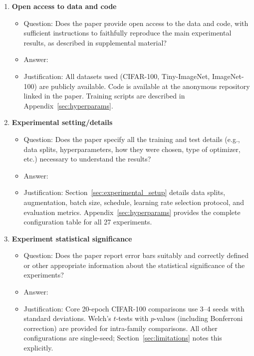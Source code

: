 \documentclass{article}
\begin{document}
\begin{enumerate}
\item {\bf Open access to data and code}
    \begin{itemize}
        \item[] Question: Does the paper provide open access to the data and code, with sufficient instructions to faithfully reproduce the main experimental results, as described in supplemental material?
        \item[] Answer: \answerYes{}
        \item[] Justification: All datasets used (CIFAR-100, Tiny-ImageNet, ImageNet-100) are publicly available. Code is available at the anonymous repository linked in the paper. Training scripts are described in Appendix~\ref{sec:hyperparams}.
    \end{itemize}

\item {\bf Experimental setting/details}
    \begin{itemize}
        \item[] Question: Does the paper specify all the training and test details (e.g., data splits, hyperparameters, how they were chosen, type of optimizer, etc.) necessary to understand the results?
        \item[] Answer: \answerYes{}
        \item[] Justification: Section~\ref{sec:experimental_setup} details data splits, augmentation, batch size, schedule, learning rate selection protocol, and evaluation metrics. Appendix~\ref{sec:hyperparams} provides the complete configuration table for all 27 experiments.
    \end{itemize}

\item {\bf Experiment statistical significance}
    \begin{itemize}
        \item[] Question: Does the paper report error bars suitably and correctly defined or other appropriate information about the statistical significance of the experiments?
        \item[] Answer: \answerYes{}
        \item[] Justification: Core 20-epoch CIFAR-100 comparisons use 3--4 seeds with standard deviations. Welch's $t$-tests with $p$-values (including Bonferroni correction) are provided for intra-family comparisons. All other configurations are single-seed; Section~\ref{sec:limitations} notes this explicitly.
    \end{itemize}


\end{enumerate}
\end{document}
